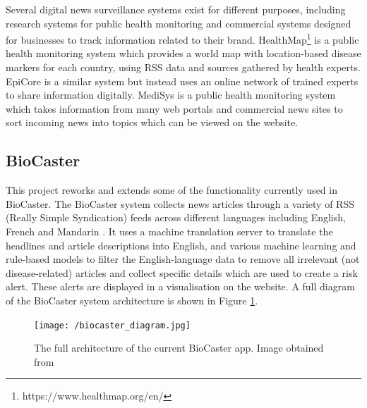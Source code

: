 \documentclass{l4proj}
\begin{document}
Several digital news surveillance systems exist for different purposes, including research systems for public health monitoring and commercial systems designed for businesses to track information related to their brand. HealthMap\footnote{https://www.healthmap.org/en/} is a public health monitoring system which provides a world map with location-based disease markers for each country, using RSS data and sources gathered by health experts. EpiCore \citep{haddad2016epicore} is a similar system but instead uses an online network of trained experts to share information digitally. MediSys \citep{steinberger2008medisys} is a public health monitoring system which takes information from many web portals and commercial news sites to sort incoming news into topics which can be viewed on the website. \par

\subsection{BioCaster}
This project reworks and extends some of the functionality currently used in BioCaster. The BioCaster system collects news articles through a variety of RSS (Really Simple Syndication) feeds across different languages including English, French and Mandarin \citep{collier2008biocaster}. It uses a machine translation server to translate the headlines and article descriptions into English, and various machine learning and rule-based models to filter the English-language data to remove all irrelevant (not disease-related) articles and collect specific details which are used to create a risk alert. These alerts are displayed in a visualisation on the website. A full diagram of the BioCaster system architecture is shown in Figure \ref{fig:biocaster_architecture}. 
 \begin{figure}[h]
 \centering
\texttt{[image: /biocaster\_diagram.jpg]}
\caption{The full architecture of the current BioCaster app. Image obtained from \cite{meng2022biocaster}}
\label{fig:biocaster_architecture}
\end{figure}
\par
\end{document}
